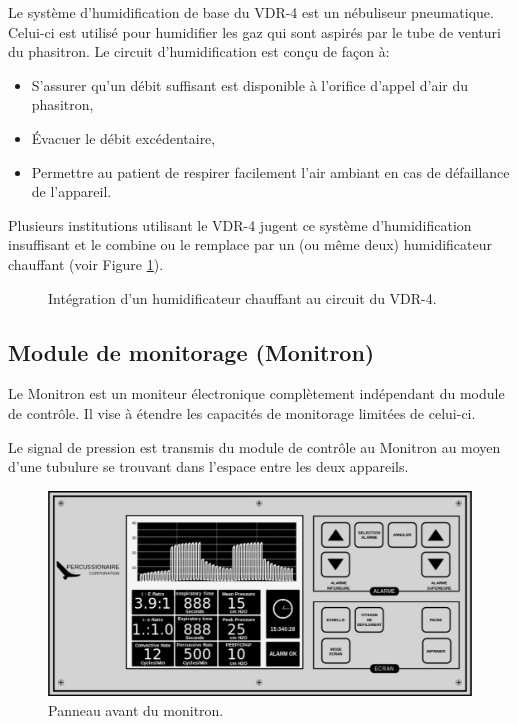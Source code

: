 Le système d'humidification de base du VDR-4 est un nébuliseur pneumatique.
Celui-ci est utilisé pour humidifier les gaz qui sont aspirés par le tube de
venturi du phasitron. Le circuit d'humidification est conçu de façon à:

\begin{itemize}
	\item S'assurer qu'un débit suffisant est disponible à l'orifice d'appel d'air du phasitron,
	\item Évacuer le débit excédentaire,
	\item Permettre au patient de respirer facilement l'air ambiant en cas de défaillance de l'appareil.
\end{itemize}

Plusieurs institutions utilisant le VDR-4 jugent ce système 
d'humidification insuffisant et le combine ou le remplace par un 
(ou même deux) humidificateur chauffant (voir Figure \ref{fig:circ}).


\begin{figure}
	
	\caption{Intégration d'un humidificateur chauffant au circuit du VDR-4.}
	\label{fig:circ}
\end{figure}

\subsection{Module de monitorage (Monitron)}

Le Monitron est un moniteur électronique complètement indépendant du
module de contrôle. Il vise à étendre les capacités de monitorage
limitées de celui-ci.

Le signal de pression est transmis du module de contrôle au Monitron
au moyen d'une tubulure se trouvant dans l'espace entre les deux
appareils.

\begin{figure}
	\includegraphics[width=\textwidth]{img/Monitron}
	\caption{Panneau avant du monitron.}
\end{figure}

